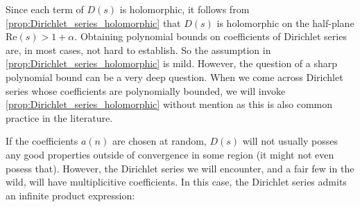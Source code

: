 \documentclass[12pt]{book}
\theoremstyle{definition}\newframedtheorem{method}{Method}
\renewcommand{\a}{\alpha}
\newcommand{\<}{\langle}
\renewcommand{\>}{\rangle}
\renewcommand{\Re}{\mathrm{Re}}
\begin{document}
      Since each term of $D(s)$ is holomorphic, it follows from \cref{prop:Dirichlet_series_holomorphic} that $D(s)$ is holomorphic on the half-plane $\Re(s) > 1+\a$. Obtaining polynomial bounds on coefficients of Dirichlet series are, in most cases, not hard to establish. So the assumption in \cref{prop:Dirichlet_series_holomorphic} is mild. However, the question of a sharp polynomial bound can be a very deep question. When we come across Dirichlet series whose coefficients are polynomially bounded, we will invoke \cref{prop:Dirichlet_series_holomorphic} without mention as this is also common practice in the literature.

      If the coefficients $a(n)$ are chosen at random, $D(s)$ will not usually posses any good properties outside of convergence in some region (it might not even posess that). However, the Dirichlet series we will encounter, and a fair few in the wild, will have multiplicitive coefficients. In this case, the Dirichlet series admits an infinite product expression:
\end{document}
